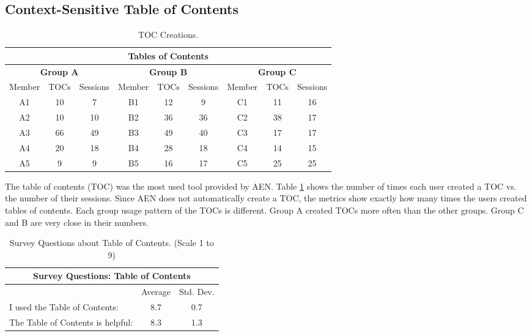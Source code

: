 \subsection{Context-Sensitive Table of Contents}
\footnotesize
\begin{table}[htb]
  \caption{TOC Creations.}
  \begin{center}
    \begin{tabular}{|c|c|c||c|c|c||c|c|c|}
      \hline
      \multicolumn{9}{|c|}{\rule[-3mm]{0mm}{8mm}\bf Tables of Contents}\\
      \hline
      \multicolumn{3}{|c||}{\rule[-3mm]{0mm}{8mm}\bf Group A}&
      \multicolumn{3}{|c||}{\rule[-3mm]{0mm}{8mm}\bf Group B}&
      \multicolumn{3}{|c|}{\rule[-3mm]{0mm}{8mm}\bf Group C}\\ \hline
      Member&TOCs&Sessions&Member&TOCs&Sessions&Member&TOCs&Sessions\\ \hline
      \hline
      A1&10&7&B1&12&9&C1&11&16\\\hline 
      A2&10&10&B2&36&36&C2&38&17\\ \hline
      A3&66&49&B3&49&40&C3&17&17\\ \hline
      A4&20&18&B4&28&18&C4&14&15\\ \hline
      A5&9&9&B5&16&17&C5&25&25\\\hline
    \end{tabular}
  \end{center}
  \label{tab:A-TOC}
\end{table}
\normalsize

The table of contents (TOC) was the most used tool provided by AEN.  Table
\ref{tab:A-TOC} shows the number of times each user created a TOC vs. the
number of their sessions.  Since AEN does not automatically create a TOC,
the metrics show exactly how many times the users created tables of
contents.  Each group usage pattern of the TOCs is different.  Group A
created TOCs more often than the other groups.  Group C and B
are very close in their numbers.


\small
\begin{table}
  \caption{Survey Questions about Table of Contents. (Scale 1 to 9)}
  \begin{center}
    \begin{tabular}{|l|c|c|}
      \hline
      \multicolumn{3}{|c|}{\rule[-3mm]{0mm}{8mm}\bf Survey Questions:
      Table of Contents}\\ \hline
      &Average&Std. Dev.\\ \hline
      I used the Table of Contents:&8.7&0.7\\ \hline
      The Table of Contents is helpful:&8.3&1.3\\ \hline
    \end{tabular}
  \end{center}
  \label{tab:survey-TOC}
\end{table}
\normalsize

